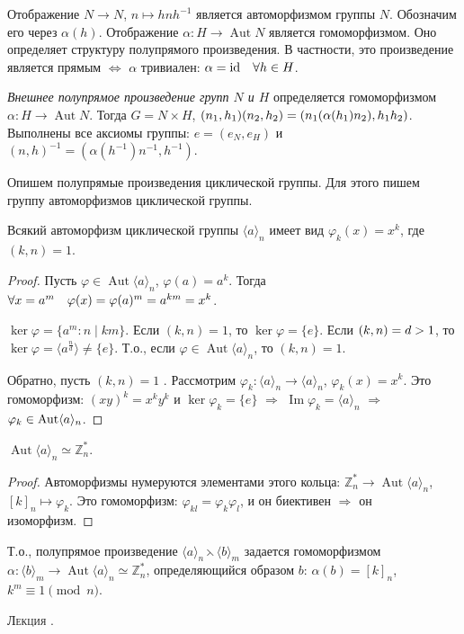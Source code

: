 \documentclass[a4paper]{article}
\newcounter{lec}
\renewcommand{\thelec}{\Roman{lec}}
\newcommand*{\lecture}[1]{\refstepcounter{lec}\vspace{20pt}
\begin{center}{\rmfamily\textsc{Лекция \thelec. \\ \textbf{#1}}}\vspace{5pt}
\end{center}}
\newcommand{\Aut}{\mathop{\mathrm{Aut}}\nolimits}
\renewcommand{\Im}{\mathop{\mathrm{Im}}\nolimits}
\newcommand*{\p}[1]{#1\nobreak\discretionary{}{\hbox{$\mathsurround=0pt #1$}}{}}
\begin{document}
Отображение $N\to N$, $n\mapsto hnh^{-1}$ является автоморфизмом
группы $N$. Обозначим его через $\alpha(h)$. Отображение
$\alpha\colon H\to \Aut N$ является гомоморфизмом. Оно определяет
структуру полупрямого произведения. В частности, это произведение
является прямым $\Leftrightarrow$ $\alpha$ тривиален:
$\alpha\p=\mathrm{id}\quad \forall h\in H$.

\emph{Внешнее полупрямое произведение групп $N$ и $H$} определяется
гомоморфизмом $\alpha\colon H\to \Aut N$. Тогда $G=N\times H$,
$(n_1,h_1)(n_2,h_2)\p=(n_1(\alpha(h_1)n_2),h_1h_2)$. Выполнены все
аксиомы группы: $e=(e_N,e_H)$ и $(n,h)^{-1}=(\alpha(h^{-1})n^{-1},
h^{-1})$.

Опишем полупрямые произведения циклической группы. Для этого пишем
группу автоморфизмов циклической группы.

\begin{theorem}
Всякий автоморфизм циклической группы $\langle a\rangle_n$ имеет вид
$\varphi_k(x)=x^k$, где $(k,n)=1$.
\end{theorem}

\begin{proof}
Пусть $\varphi\in \Aut\langle a\rangle_n$, $\varphi(a)=a^k$. Тогда
$\forall x=a^m\quad \varphi(x)\p=\varphi(a)^m=a^{km}=x^k$.

$\ker\varphi=\{a^m: n\mid km\}$. Если $(k,n)=1$, то
$\ker\varphi=\{e\}$. Если $(k,n)\p=d>1$, то $\ker\varphi=\langle
a^\frac nd\rangle\neq\{e\}$. Т.о., если $\varphi\in\Aut \langle
a\rangle_n$, то $(k,n)=1$.

Обратно, пусть $(k,n)=1$ . Рассмотрим $\varphi_k\colon\langle
a\rangle_n\to \langle a\rangle_n$, $\varphi_k(x)=x^k$. Это
гомоморфизм: $(xy)^k=x^ky^k$ и $\ker\varphi_k=\{e\}$ $\Rightarrow$
$\Im \varphi_k=\langle a\rangle_n$ $\Rightarrow$ $\varphi_k\p\in
\Aut \langle a\rangle_n$.
\end{proof}

\begin{sled}
$\Aut \langle a\rangle_n\simeq \mathbb{Z}_n^*$.
\end{sled}

\begin{proof}
Автоморфизмы нумеруются элементами этого кольца: $\mathbb{Z}_n^*\to
\Aut\langle a\rangle_n$, $[k]_n\mapsto \varphi_k$. Это гомоморфизм:
$\varphi_{kl}=\varphi_k\varphi_l$, и он биективен $\Rightarrow$ он
изоморфизм.
\end{proof}

Т.о., полупрямое произведение $\langle
a\rangle_n\leftthreetimes\langle b\rangle_m$ задается гомоморфизмом
$\alpha\colon \langle b\rangle_m\to \Aut \langle a\rangle_n\simeq
\mathbb{Z}_n^*$, определяющийся образом $b$: $\alpha(b)=[k]_n$,
$k^m\equiv 1\pmod{n}$.
\lecture{}
\end{document}
